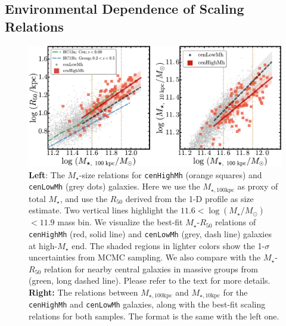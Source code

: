 \documentclass[a4paper,fleqn,usenatbib]{mnras}
\def\rbcg{\texttt{cenHighMh}}
\def\nbcg{\texttt{cenLowMh}}
\def\mstar{{$M_{\star}$}}
\def\logms{{$\log (M_{\star}/M_{\odot})$}}
\def\minn{{$M_{\star,10\mathrm{kpc}}$}}
\def\mtot{{$M_{\star,100\mathrm{kpc}}$}}
\begin{document}
     
\subsection{Environmental Dependence of Scaling Relations}
    \label{ssec:scaling}

  \begin{figure}
      \centering 
      \includegraphics[width=\textwidth]{fig/redbcg_scaling_relation}
      \caption{
          \textbf{Left}: The \mstar{}-size relations for \rbcg{} 
          (orange squares) and \nbcg{} (grey dots) galaxies. 
          Here we use the \mtot{} as proxy of total \mstar{}, and use the 
          $R_{\mathrm{50}}$ derived from the 1-D profile as size estimate. 
          Two vertical lines highlight the $11.6<$\logms{}$<11.9$ mass bin.
          We visualize the best-fit \mstar{}-$R_{\mathrm{50}}$ relations of \rbcg{} 
          (red, solid line) and \nbcg{} (grey, dash line) galaxies at high-\mstar{} end.
          The shaded regions in lighter colors show the 1-$\sigma$ uncertainties
          from MCMC sampling. 
          We also compare with the \mstar{}-$R_{\mathrm{50}}$ relation for nearby central 
          galaxies in massive groups from \citet{HCompany13} (green, long dashed line). 
          Please refer to the text for more details.~
          \textbf{Right:} The relations between \mtot{} and \minn{} for the 
          \rbcg{} and \nbcg{} galaxies, along with the best-fit scaling relations for 
          both samples.  The format is the same with the left one.
          }
      \label{fig:scaling_relation} 
  \end{figure}
\end{document}
